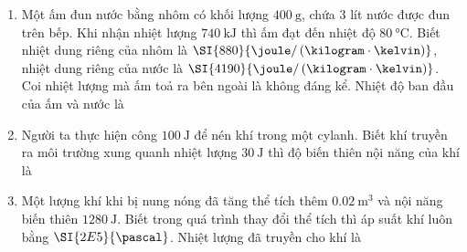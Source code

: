 \begin{enumerate}[label=\bfseries Câu \arabic*:, leftmargin=1.7cm]
\item Một ấm đun nước bằng nhôm có khối lượng $\SI{400}{\gram}$, chứa 3 lít nước được đun trên bếp. Khi nhận nhiệt lượng $\SI{740}{\kilo\joule}$ thì ấm đạt đến nhiệt độ $\SI{80}{\celsius}$. Biết nhiệt dung riêng của nhôm là $\SI{880}{\joule/\left(\kilogram\cdot\kelvin\right)}$, nhiệt dung riêng của nước là $\SI{4190}{\joule/\left(\kilogram\cdot\kelvin\right)}$. Coi nhiệt lượng mà ấm toả ra bên ngoài là không đáng kể. Nhiệt độ ban đầu của ấm và nước là

\item Người ta thực hiện công $\SI{100}{\joule}$ để nén khí trong một cylanh. Biết khí truyền ra môi trường xung quanh nhiệt lượng $\SI{30}{\joule}$ thì độ biến thiên nội năng của khí là

\item Một lượng khí khi bị nung nóng đã tăng thể tích thêm $\SI{0.02}{\meter^3}$ và nội năng biến thiên $\SI{1280}{\joule}$. Biết trong quá trình thay đổi thể tích thì áp suất khí luôn bằng $\SI{2E5}{\pascal}$. Nhiệt lượng đã truyền cho khí là
\end{enumerate}
